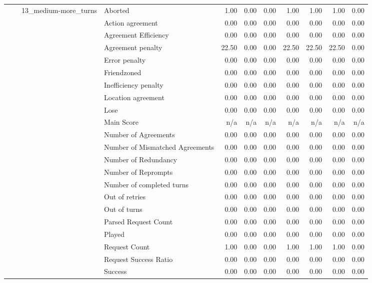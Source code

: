 \begin{tabular}{llllrrrrrrr}
\cline{3-11}
 &  & \multirow[t]{27}{*}{13_medium-more_turns} & Aborted & 1.00 & 0.00 & 0.00 & 1.00 & 1.00 & 1.00 & 0.00 \\
 &  &  & Action agreement & 0.00 & 0.00 & 0.00 & 0.00 & 0.00 & 0.00 & 0.00 \\
 &  &  & Agreement Efficiency & 0.00 & 0.00 & 0.00 & 0.00 & 0.00 & 0.00 & 0.00 \\
 &  &  & Agreement penalty & 22.50 & 0.00 & 0.00 & 22.50 & 22.50 & 22.50 & 0.00 \\
 &  &  & Error penalty & 0.00 & 0.00 & 0.00 & 0.00 & 0.00 & 0.00 & 0.00 \\
 &  &  & Friendzoned & 0.00 & 0.00 & 0.00 & 0.00 & 0.00 & 0.00 & 0.00 \\
 &  &  & Inefficiency penalty & 0.00 & 0.00 & 0.00 & 0.00 & 0.00 & 0.00 & 0.00 \\
 &  &  & Location agreement & 0.00 & 0.00 & 0.00 & 0.00 & 0.00 & 0.00 & 0.00 \\
 &  &  & Lose & 0.00 & 0.00 & 0.00 & 0.00 & 0.00 & 0.00 & 0.00 \\
 &  &  & Main Score & n/a & n/a & n/a & n/a & n/a & n/a & n/a \\
 &  &  & Number of Agreements & 0.00 & 0.00 & 0.00 & 0.00 & 0.00 & 0.00 & 0.00 \\
 &  &  & Number of Mismatched Agreements & 0.00 & 0.00 & 0.00 & 0.00 & 0.00 & 0.00 & 0.00 \\
 &  &  & Number of Redundancy & 0.00 & 0.00 & 0.00 & 0.00 & 0.00 & 0.00 & 0.00 \\
 &  &  & Number of Reprompts & 0.00 & 0.00 & 0.00 & 0.00 & 0.00 & 0.00 & 0.00 \\
 &  &  & Number of completed turns & 0.00 & 0.00 & 0.00 & 0.00 & 0.00 & 0.00 & 0.00 \\
 &  &  & Out of retries & 0.00 & 0.00 & 0.00 & 0.00 & 0.00 & 0.00 & 0.00 \\
 &  &  & Out of turns & 0.00 & 0.00 & 0.00 & 0.00 & 0.00 & 0.00 & 0.00 \\
 &  &  & Parsed Request Count & 0.00 & 0.00 & 0.00 & 0.00 & 0.00 & 0.00 & 0.00 \\
 &  &  & Played & 0.00 & 0.00 & 0.00 & 0.00 & 0.00 & 0.00 & 0.00 \\
 &  &  & Request Count & 1.00 & 0.00 & 0.00 & 1.00 & 1.00 & 1.00 & 0.00 \\
 &  &  & Request Success Ratio & 0.00 & 0.00 & 0.00 & 0.00 & 0.00 & 0.00 & 0.00 \\
 &  &  & Success & 0.00 & 0.00 & 0.00 & 0.00 & 0.00 & 0.00 & 0.00 \\

\end{tabular}
